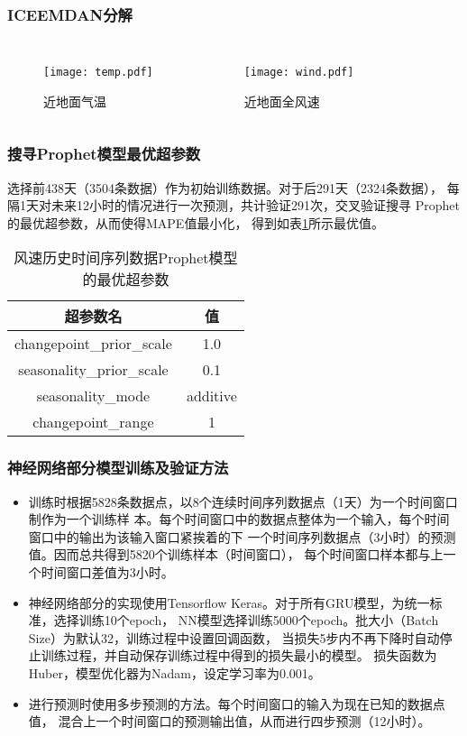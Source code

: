 \documentclass[14pt, AutoFakeBold]{ppt}
\begin{document}
\begin{frame}
  \frametitle{ICEEMDAN分解}
  \begin{columns}
    \begin{figure}[H]
      \centering
      \texttt{[image: temp.pdf]}
      \caption{近地面气温}
      \label{fig_ICEEMDAN_temp}
    \end{figure}
    \begin{figure}[H]
      \centering
      \texttt{[image: wind.pdf]}
      \caption{近地面全风速}
      \label{fig_ICEEMDAN_wind}
    \end{figure}
  \end{columns}
\end{frame}

\begin{frame}
  \frametitle{搜寻Prophet模型最优超参数}
  选择前438天（3504条数据）作为初始训练数据。对于后291天（2324条数据），
  每隔1天对未来12小时的情况进行一次预测，共计验证291次，交叉验证搜寻
  Prophet的最优超参数，从而使得MAPE值最小化，
  得到如表\ref{prophet_param}所示最优值。

\begin{table}[H]
  \centering
  \caption{风速历史时间序列数据Prophet模型的最优超参数}
  \begin{tabular}{cc}
  \toprule
  超参数名 & 值 \\
  \midrule
  changepoint\_prior\_scale & 1.0 \\
  seasonality\_prior\_scale & 0.1 \\
  seasonality\_mode & additive \\
  changepoint\_range & 1 \\
  \bottomrule
  \end{tabular}
  \label{prophet_param}
\end{table}
\end{frame}

\begin{frame}
  \frametitle{神经网络部分模型训练及验证方法}
  \begin{itemize}
    \item 训练时根据5828条数据点，以8个连续时间序列数据点（1天）为一个时间窗口制作为一个训练样
  本。每个时间窗口中的数据点整体为一个输入，每个时间窗口中的输出为该输入窗口紧挨着的下
  一个时间序列数据点（3小时）的预测值。因而总共得到5820个训练样本（时间窗口），
  每个时间窗口样本都与上一个时间窗口差值为3小时。

    \item 神经网络部分的实现使用Tensorflow Keras。对于所有GRU模型，为统一标准，选择训练10个epoch，
  NN模型选择训练5000个epoch。批大小（Batch Size）为默认32，训练过程中设置回调函数，
  当损失5步内不再下降时自动停止训练过程，并自动保存训练过程中得到的损失最小的模型。
  损失函数为Huber，模型优化器为Nadam，设定学习率为0.001。

    \item 进行预测时使用多步预测的方法。每个时间窗口的输入为现在已知的数据点值，
  混合上一个时间窗口的预测输出值，从而进行四步预测（12小时）。
  \end{itemize}
\end{frame}
\end{document}
